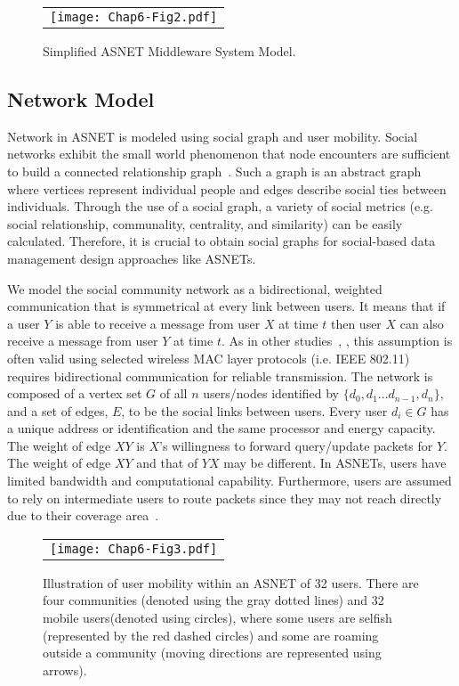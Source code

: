 \begin{figure}[t]
\begin{center}
  \begin{tabular}{c}
  \texttt{[image: Chap6-Fig2.pdf]}
  \end{tabular}
  \caption{Simplified ASNET Middleware System Model.}
\end{center}
\end{figure}

\subsection{Network Model}\label{Chap6_03_01}
Network in ASNET is modeled using social graph and user mobility. Social networks exhibit the small world phenomenon that node encounters are sufficient to build a connected relationship graph~\cite{FXia2013}. Such a graph is an abstract graph where vertices represent individual people and edges describe social ties between individuals. Through the use of a social graph, a variety of social metrics (e.g. social relationship, communality, centrality, and similarity) can be easily calculated. Therefore, it is crucial to obtain social graphs for social-based data management design approaches like ASNETs.

We model the social community network as a bidirectional, weighted communication that is symmetrical at every link between users. It means that if a user $Y$ is able to receive a message from user $X$ at time $t$ then user $X$ can also receive a message from user $Y$ at time $t$. As in other studies~\cite{QLi2010}, \cite{KGopalakrishnan2009}, this assumption is often valid using selected wireless MAC layer protocols (i.e. IEEE 802.11) requires bidirectional communication for reliable transmission. The network is composed of a vertex set $G$ of all $n$ users/nodes identified by $\{d_0, d_1 ... d_{n-1}, d_n\}$, and a set of edges, $E$, to be the social links between users. Every user $d_i \in G$ has a unique address or identification and the same processor and energy capacity. The weight of edge $XY$ is $X$'s willingness to forward query/update packets for $Y$. The weight of edge $XY$ and that of $YX$ may be different. In ASNETs, users have limited bandwidth and computational capability. Furthermore, users are assumed to rely on intermediate users to route packets since they may not reach directly due to their coverage area~\cite{HBLiaqat2014}.
\begin{figure}[h]
\begin{center}
  \begin{tabular}{c}
  \texttt{[image: Chap6-Fig3.pdf]}
  \end{tabular}
  \caption{Illustration of user mobility within an ASNET of 32 users. There are four communities (denoted using the gray dotted lines) and 32 mobile users(denoted using circles), where some users are selfish (represented by the red dashed circles) and some are roaming outside a community (moving directions are represented using arrows).}
\end{center}
\end{figure}

